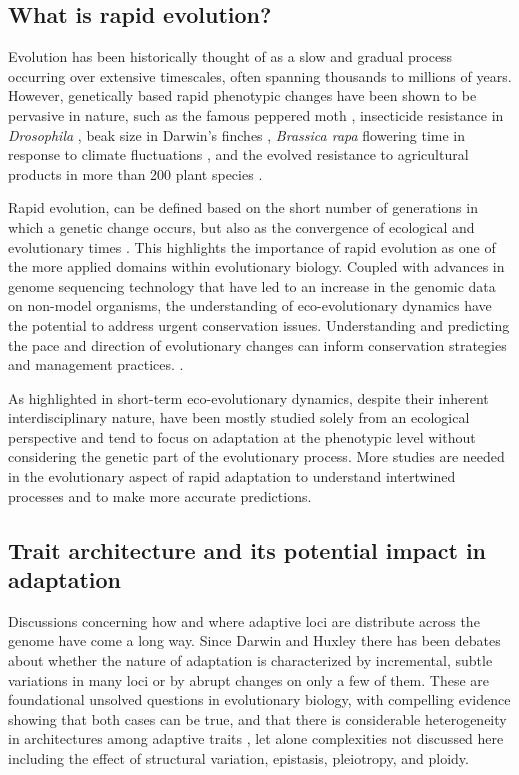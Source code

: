 \documentclass{article}
\begin{document}
\subsection{What is rapid evolution?}
Evolution has been historically thought of as a slow and gradual process occurring over extensive timescales, often spanning thousands to millions of years. However, genetically based rapid phenotypic changes have been shown to be pervasive in nature, such as the famous peppered moth \citep{Cook2013-bs}, insecticide resistance in \textit{Drosophila} \citep{Daborn2002-is}, beak size in Darwin’s finches \citep{Grant2008-uc}, \textit{Brassica rapa} flowering time in response to climate fluctuations \citep{Franks2007-ys}, and the evolved resistance to agricultural products in more than 200 plant species \citep{Heap2020}. 

Rapid evolution, can be defined based on the short number of generations in which a genetic change occurs, but also as the convergence of ecological and evolutionary times \citep{Hairston2005-qo}. This highlights the importance of rapid evolution as one of the more applied domains within evolutionary biology. Coupled with advances in genome sequencing technology that have led to an increase in the genomic data on non-model organisms, the understanding of eco-evolutionary dynamics have the potential to address urgent conservation issues. Understanding and predicting the pace and direction of evolutionary changes can inform conservation strategies and management practices. \citep{Bay2017-uu, Coulson2017-yh, Forester2022-yl}.

As highlighted in \citep{Yamamichi2022-yj} short-term eco-evolutionary dynamics, despite their inherent interdisciplinary nature, have been mostly studied solely from an ecological perspective and tend to focus on adaptation at the phenotypic level without considering the genetic part of the evolutionary process. More studies are needed in the evolutionary aspect of rapid adaptation to understand intertwined processes and to make more accurate predictions. \citep{Rudman2022-uc}

\subsection{Trait architecture and its potential impact in adaptation}
Discussions concerning  how and where adaptive loci are distribute across the genome have come a long way. Since Darwin \citep{Darwin1859-yh} and Huxley \citep{Huxley1860} there has been debates about whether the nature of adaptation is characterized by incremental, subtle variations in many loci or by abrupt changes on only a few of them. These are foundational unsolved questions in evolutionary biology, with compelling evidence showing that both cases can be true, and that there is considerable heterogeneity in architectures among adaptive traits \citep{Orr1992-xj, Orr1998-pr}, let alone complexities not discussed here including  the effect of structural variation, epistasis, pleiotropy, and ploidy. 
\end{document}
